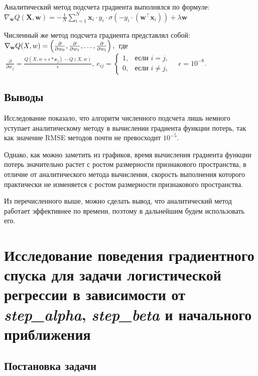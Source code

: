 \documentclass[14pt]{extarticle}
\begin{document}
Аналитический метод подсчета градиента выполнялся по формуле: \\ $ \nabla_{\mathbf{w}} Q(\mathbf{X}, \mathbf{w}) = -\frac{1}{N} \sum_{i=1}^{N} \mathbf{x}_i \cdot y_i \cdot \sigma\left(-y_i \cdot (\mathbf{w}^\top \mathbf{x}_i)\right) + \lambda \mathbf{w} $

Численный же метод подсчета градиента представлял собой: \\
$ \nabla_{\mathbf{w}} Q(X, w) = \left( \frac{\partial}{\partial w_0},
\frac{\partial}{\partial w_1}, \ldots, \frac{\partial}{\partial w_l} \right), \\ $ где $ \ \frac{\partial}{\partial w_j} = \frac{Q(X, w + \epsilon * \mathbf{e}_j) - Q(X, w)}{\epsilon}, \
e_{ij} = \begin{cases} 1, & \text{если } i = j, \\ 0, & \text{если } i \neq j, \end{cases} \quad \epsilon = 10^{-8}. $

\subsection{Выводы}

Исследование показало, что алгоритм численного подсчета лишь немного уступает аналитическому методу в вычислении градиента функции потерь, так как значение RMSE методов почти не превосходит $ 10^{-5} $.

Однако, как можно заметить из графиков, время вычисления градиента функции потерь значительно растет с ростом размерности признакового пространства, в отличие от аналитического метода вычисления, скорость выполнения которого практически не изменяется с ростом размерности признакового пространства.

Из перечисленного выше, можно сделать вывод, что аналитический метод работает эффективнее по времени, поэтому в дальнейшим будем использовать его.

\section{Исследование поведения градиентного спуска для задачи логистической регрессии в зависимости от \textit{step\_alpha}, \textit{step\_beta} и начального приближения} \label{sec:section5}

\subsection{Постановка задачи}
\end{document}
